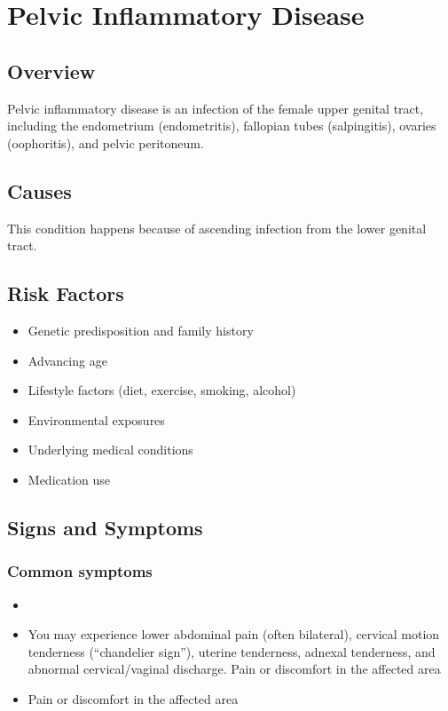 \chapter{Pelvic Inflammatory Disease}
\label{sec:Pelvic Inflammatory Disease}

\section{Overview}
Pelvic inflammatory disease is an infection of the female upper genital tract, including the endometrium (endometritis), fallopian tubes (salpingitis), ovaries (oophoritis), and pelvic peritoneum.
\section{Causes}
This condition happens because of ascending infection from the lower genital tract.     
\section{Risk Factors}

\begin{itemize}[noitemsep]
  \item Genetic predisposition and family history
  \item Advancing age
  \item Lifestyle factors (diet, exercise, smoking, alcohol)
  \item Environmental exposures
  \item Underlying medical conditions
  \item Medication use
\end{itemize}
\section{Signs and Symptoms}

\subsection{Common symptoms}
\begin{itemize}[noitemsep]
  \item \item You may experience lower abdominal pain (often bilateral), cervical motion tenderness (``chandelier sign''), uterine tenderness, adnexal tenderness, and abnormal cervical/vaginal discharge. Pain or discomfort in the affected area    \item Pain or discomfort in the affected area
  \end{itemize}

